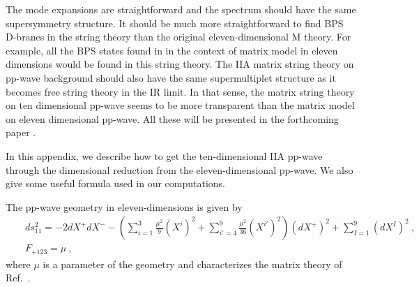 \documentclass[a4paper,12pt]{article}
\begin{document}
The mode expansions are straightforward and the spectrum should have
the same supersymmetry structure.  It should be much more
straightforward to find BPS D-branes in the string theory
\cite{dab231,ske054,kns025,ak134,bis042} than the original
eleven-dimensional M theory. For example, all the BPS states found in
\cite{hyu090,bak033,ali237} in the context of matrix model in eleven
dimensions would be found in this string theory.  The IIA matrix
string theory on pp-wave background should also have the same
supermultiplet structure as it becomes free string theory in the IR
limit.  In that sense, the matrix string theory on ten dimensional
pp-wave seems to be more transparent than the matrix model on eleven
dimensional pp-wave.  All these will be presented in the forthcoming
paper \cite{hyuxxx}.




\vspace{12mm} 

\appendix\setcounter{section}{0} %
In this appendix, we describe how to get the ten-dimensional IIA
pp-wave through the dimensional reduction from the eleven-dimensional
pp-wave. We also give some useful formula used in our computations.
 
The pp-wave geometry in eleven-dimensions  is given by
\begin{eqnarray}
& & ds_{11}^2 = - 2 dX^+ dX^-
    - \left( \sum^3_{i=1} \frac{\mu^2}{9} (X^i)^2
            +\sum^9_{i'=4} \frac{\mu^2}{36} (X^{i'})^2
      \right) (dX^+)^2
    + \sum^9_{I=1} (dX^I)^2~,
                                      \nonumber \\
& & F_{+123} = \mu~,
\label{pp-wave-1}
\end{eqnarray}
where $\mu$ is a parameter of the geometry and characterizes the
matrix theory of Ref.~\cite{ber021}. 
\end{document}
